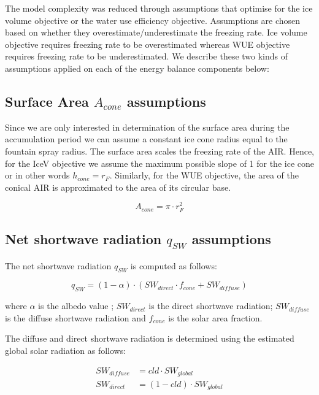 \documentclass[tc, manuscript]{copernicus}
\begin{document}
The model complexity was reduced through assumptions that optimise for the ice volume objective or the water use
efficiency objective. Assumptions are chosen based on whether they overestimate/underestimate the freezing rate.
Ice volume objective requires freezing rate to be overestimated whereas WUE objective requires freezing rate to
be underestimated. We describe these two kinds of assumptions applied on each of the energy balance components
below: 

\subsection{Surface Area $A_{cone}$ assumptions}

Since we are only interested in determination of the surface area during the accumulation period we can assume a
constant ice cone radius equal to the fountain spray radius. The surface area scales the freezing rate of the
AIR. Hence, for the IceV objective we assume the maximum possible slope of 1 for the ice cone or in other words
$h_{cone} = r_{F}$. Similarly, for the WUE objective, the area of the conical AIR is
approximated to the area of its circular base. 

\begin{equation} A_{cone} =\pi \cdot r_{F}^2 \label{eq:Area} \end{equation}

\subsection{Net shortwave radiation \texorpdfstring{$q_{SW}$}{Lg} assumptions}
\label{sec:SW}

The net shortwave radiation $q_{SW}$ is computed as follows:

\begin{equation} q_{SW} = (1- \alpha) \cdot ( SW_{direct} \cdot f_{cone} + SW_{diffuse})
\label{eqn:SW} \end{equation}

where $\alpha$ is the albedo value ; $SW_{direct}$ is the direct shortwave radiation; $SW_{diffuse}$ is the
diffuse shortwave radiation and $f_{cone}$ is the solar area fraction.

The diffuse and direct shortwave radiation is determined using the estimated global solar radiation as follows:

\begin{equation}
\begin{split}
  SW_{diffuse} &= cld \cdot SW_{global}\\
  SW_{direct} &= (1-cld) \cdot SW_{global}
\end{split}
\end{equation}
\end{document}

